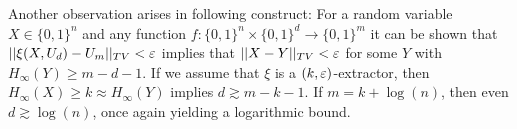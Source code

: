 Another observation arises in following construct:
For a random variable $X \in \{0,1\}^n$ and any function
$f : \{0,1\}^n \times \{0,1\}^d \rightarrow \{0,1\}^m$
it can be shown that
$||\xi(X, U_d) - U_m||_{TV} < \varepsilon $
implies that
$||X - Y||_{TV} < \varepsilon$ for some $Y$ with $H_\infty(Y) \geq m - d - 1$.
If we assume that $\xi$ is a $(k, \varepsilon)$-extractor, then
$H_\infty(X) \geq k \approx H_\infty(Y)$ implies $d \gtrsim m-k-1$.
If $m = k + \log(n)$, then even $d \gtrsim \log(n)$, once again yielding a logarithmic bound.
